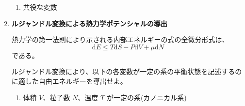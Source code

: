 \documentclass[uplatex,dvipdfmx,a4paper,11pt]{jsarticle}
\newcommand{\diff}{\mathrm d}
\begin{document}
\begin{enumerate}
\begin{enumerate}

\item
共役な変数

%

\end{enumerate}

\item
{\bf ルジャンドル変換による熱力学ポテンシャルの導出}


熱力学の第一法則により示される内部エネルギーの式の全微分形式は、
\begin{equation*}
\diff E \leq T \diff S - P \diff V + \mu \diff N
\end{equation*}
である。

ルジャンドル変換により、以下の各変数が一定の系の平衡状態を記述するのに適した自由エネルギーを導出せよ。

\begin{enumerate}
\item
体積 $V$、粒子数 $N$、温度 $T$ が一定の系(カノニカル系)

%
%
%
%	 	
%
%	 	
%



\end{enumerate}
\end{enumerate}
\end{document}
